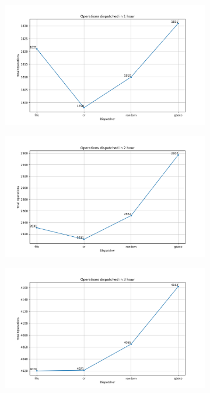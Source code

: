 \begin{figure}[t]
	\centering
	\begin{subfigure}{0.32\textwidth}
		\includegraphics[width=\textwidth]{HVLM/total_operations_3600s.png}
	\end{subfigure}\hfill
	\begin{subfigure}{0.32\textwidth}
		\includegraphics[width=\textwidth]{HVLM/total_operations_7200s.png}
	\end{subfigure}\hfill
	\begin{subfigure}{0.32\textwidth}
		\includegraphics[width=\textwidth]{HVLM/total_operations_10800s.png}

\end{subfigure}
\end{figure}
